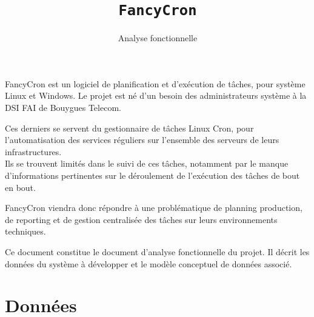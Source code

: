 \documentclass{bouygues-fr}
\begin{document}
\title{\texttt{FancyCron}}
\subtitle{Analyse fonctionnelle}



\summary
{
  FancyCron est un logiciel de planification et d'exécution de tâches, pour système Linux et Windows. Le projet est né d'un besoin des administrateurs système à la DSI FAI de Bouygues Telecom.

  Ces derniers se servent du gestionnaire de tâches Linux Cron, pour l'automatisation des services réguliers sur l'ensemble des serveurs de leurs infrastructures.\\
Ils se trouvent limités dans le suivi de ces tâches, notamment par le manque d'informations pertinentes sur le déroulement de l'exécution des tâches de bout en bout.

  FancyCron viendra donc répondre à une problématique de planning production, de reporting et de gestion centralisée des tâches sur leurs environnements techniques. 

  Ce document constitue le document d'analyse fonctionnelle du projet. Il décrit les données du système à développer et le modèle conceptuel de données associé.
}

\maketitle

\tableofcontents

\renewcommand{\labelitemi}{$\bullet$}
\renewcommand{\labelitemii}{$\circ$}

\newpage

\chapter{Données}
\end{document}
